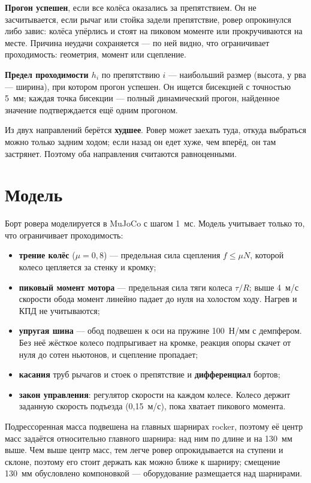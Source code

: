 \documentclass[11pt,a4paper]{article}
\begin{document}
\textbf{Прогон успешен}, если все колёса оказались за препятствием. Он не засчитывается,
если рычаг или стойка задели препятствие, ровер опрокинулся либо завис: колёса упёрлись и стоят
на пиковом моменте или прокручиваются на месте. Причина неудачи сохраняется --- по ней видно,
что ограничивает проходимость: геометрия, момент или сцепление.

\textbf{Предел проходимости $h_i$} по препятствию $i$ --- наибольший размер (высота, у рва ---
ширина), при котором прогон успешен. Он ищется бисекцией с точностью 5~мм; каждая точка
бисекции --- полный динамический прогон, найденное значение подтверждается ещё одним прогоном.

Из двух направлений берётся \textbf{худшее}. Ровер может заехать туда, откуда выбраться можно
только задним ходом; если назад он едет хуже, чем вперёд, он там застрянет. Поэтому оба
направления считаются равноценными.

\section{Модель}

Борт ровера моделируется в MuJoCo с шагом 1~мс. Модель учитывает только то, что ограничивает
проходимость:
\begin{itemize}
  \item \textbf{трение колёс} ($\mu=0{,}8$) --- предельная сила сцепления $f\le\mu N$,
        которой колесо цепляется за стенку и кромку;
  \item \textbf{пиковый момент мотора} --- предельная сила тяги колеса $\tau/R$;
        выше 4~м/с скорости обода момент линейно падает до нуля на холостом ходу.
        Нагрев и КПД не учитываются;
  \item \textbf{упругая шина} --- обод подвешен к оси на пружине 100~Н/мм с демпфером.
        Без неё жёсткое колесо подпрыгивает на кромке, реакция опоры скачет от нуля до сотен
        ньютонов, и сцепление пропадает;
  \item \textbf{касания} труб рычагов и стоек о препятствие и \textbf{дифференциал} бортов;
  \item \textbf{закон управления}: регулятор скорости на каждом колесе. Колесо держит заданную
        скорость подъезда (0,15~м/с), пока хватает пикового момента.
\end{itemize}

Подрессоренная масса подвешена на главных шарнирах rocker, поэтому её центр масс задаётся
относительно главного шарнира: над ним по длине и на 130~мм выше. Чем выше центр масс, тем
легче ровер опрокидывается на ступени и склоне, поэтому его стоит держать как можно ближе
к шарниру; смещение 130~мм обусловлено компоновкой --- оборудование размещается над шарнирами.
\end{document}
